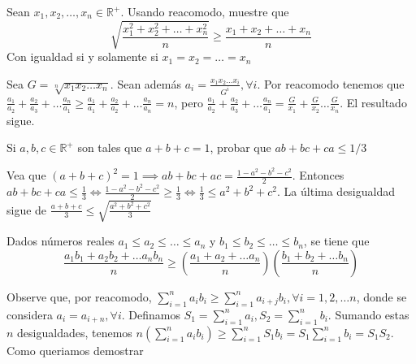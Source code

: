 \begin{ejer}
	Sean $x_{1},x_{2},\dots ,x_{n} \in \mathbb{R}^{+}$. Usando reacomodo, muestre que
	\begin{equation}
	    \sqrt{\frac{x_{1}^{2} + x_{2}^{2} + \dots + x_{n}^{2}}{n}} \geq \frac{x_{1} + x_{2} +\dots + x_{n}}{n}
	\end{equation}
	Con igualdad si y solamente si $x_{1} = x_{2} = \dots = x_{n}$
\end{ejer}

\begin{sol}
	Sea $G = \sqrt[n]{x_{1}x_{2}\dots x_{n}}$. Sean adem\'as $a_{i} = \frac{x_{1}x_{2} \dots x_{i}}{G^{i}}, \forall i$. Por reacomodo tenemos que $\frac{a_{1}}{a_{2}} + \frac{a_{2}}{a_{3}} + \dots \frac{a_{n}}{a_{1}}  \geq \frac{a_{1}}{a_{1}} + \frac{a_{2}}{a_{2}} + \dots \frac{a_{n}}{a_{n}}  = n$, pero $\frac{a_{1}}{a_{2}} + \frac{a_{2}}{a_{3}} + \dots \frac{a_{n}}{a_{1}} = \frac{G}{x_{1}} + \frac{G}{x_{2}} \dots \frac{G}{x_{n}}$. El resultado sigue.   
\end{sol}

\begin{ejer}
	Si $a,b,c \in \mathbb{R}^{+}$ son tales que $a+b+c=1$, probar que $ab+bc+ca\leq 1/3$
\end{ejer}

\begin{sol}
	Vea que $(a+b+c)^2 = 1 \implies ab+bc+ac = \frac{1-a^2-b^2-c^2}{2}$. Entonces $ab+bc+ca \leq \frac{1}{3} \iff \frac{1-a^2-b^2-c^2}{2} \geq \frac{1}{3} \iff \frac{1}{3} \leq a^2+b^2+c^2$. La \'ultima desigualdad sigue de $\frac{a+b+c}{3} \leq \sqrt{\frac{a^2+b^2+c^2}{3}}$
\end{sol}

\begin{ejer}
	Dados números reales $a_1\leq a_2\leq \dots \leq a_n$ y $b_1\leq b_2\leq \dots \leq b_n$, se tiene que
	\begin{equation}
	\frac{a_{1}b_{1} + a_{2}b_{2} + \dots a_{n}b_{n}}{n} \geq \left( \frac{a_{1} + a_{2} + \dots a_{n}}{n} \right)\left( \frac{b_{1} + b_{2} + \dots b_{n}}{n} \right)
	\end{equation}
\end{ejer}

\begin{sol}
	Observe que, por reacomodo, $\sum_{i=1}^{n} a_{i}b_{i} \geq \sum_{i=1}^{n} a_{i+j}b_{i}, \forall i = 1, 2, \dots n$, donde se considera $a_{i} = a_{i+n}, \forall i$. Definamos $S_{1} = \sum_{i=1}^{n} a_{i}, S_{2} = \sum_{i=1}^{n} b_{i}$. Sumando estas $n$ desigualdades, tenemos
	$n(\sum_{i=1}^{n} a_{i}b_{i}) \geq \sum_{i=1}^{n} S_{1}b_{i} = S_{1}\sum_{i=1}^{n} b_{i} = S_{1}S_{2}$. Como queriamos demostrar
\end{sol}

